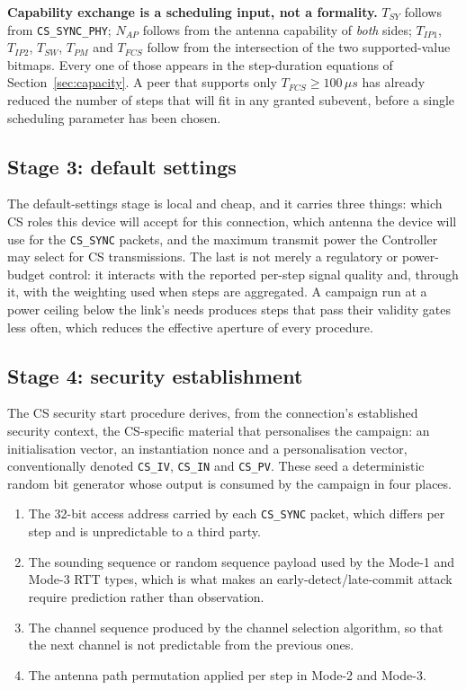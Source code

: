 \documentclass[11pt,a4paper]{article}
\newcommand{\us}{\,\ensuremath{\upmu}s}
\newcommand{\code}[1]{\texttt{\small #1}}
\newcommand{\Tsy}{T_{SY}}
\newcommand{\Tip}{T_{IP1}}
\newcommand{\Tipp}{T_{IP2}}
\newcommand{\Tfcs}{T_{FCS}}
\newcommand{\Tsw}{T_{SW}}
\newcommand{\Tpm}{T_{PM}}
\newcommand{\Nap}{N_{AP}}
\providecommand{\upmu}{\mu}
\begin{document}
\begin{callout}
\textbf{Capability exchange is a scheduling input, not a formality.} $\Tsy$ follows from
\code{CS\_SYNC\_PHY}; $\Nap$ follows from the antenna capability of \emph{both} sides; $\Tip$,
$\Tipp$, $\Tsw$, $\Tpm$ and $\Tfcs$ follow from the intersection of the two supported-value bitmaps.
Every one of those appears in the step-duration equations of Section~\ref{sec:capacity}. A peer that
supports only $\Tfcs \ge 100\us$ has already reduced the number of steps that will fit in any granted
subevent, before a single scheduling parameter has been chosen.
\end{callout}

\subsection{Stage 3: default settings}

The default-settings stage is local and cheap, and it carries three things: which CS roles this
device will accept for this connection, which antenna the device will use for the \code{CS\_SYNC}
packets, and the maximum transmit power the Controller may select for CS transmissions. The last is
not merely a regulatory or power-budget control: it interacts with the reported per-step signal
quality and, through it, with the weighting used when steps are aggregated. A campaign run at a power
ceiling below the link's needs produces steps that pass their validity gates less often, which
reduces the effective aperture of every procedure.

\subsection{Stage 4: security establishment}
\label{sec:config-sec}

The CS security start procedure derives, from the connection's established security context, the
CS-specific material that personalises the campaign: an initialisation vector, an instantiation
nonce and a personalisation vector, conventionally denoted \code{CS\_IV}, \code{CS\_IN} and
\code{CS\_PV}. These seed a deterministic random bit generator whose output is consumed by the
campaign in four places.

\begin{enumerate}[leftmargin=1.5em,itemsep=2pt]
\item The 32-bit access address carried by each \code{CS\_SYNC} packet, which differs per step and is
      unpredictable to a third party.
\item The sounding sequence or random sequence payload used by the Mode-1 and Mode-3 RTT types, which
      is what makes an early-detect/late-commit attack require prediction rather than observation.
\item The channel sequence produced by the channel selection algorithm, so that the next channel is
      not predictable from the previous ones.
\item The antenna path permutation applied per step in Mode-2 and Mode-3.
\end{enumerate}
\end{document}
